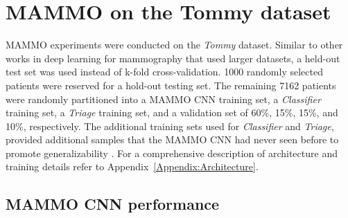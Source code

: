 \documentclass[journal]{IEEEtran}
\begin{document}
\section{MAMMO on the Tommy dataset}

MAMMO experiments were conducted on the \textit{Tommy} dataset. Similar to other works in deep learning for mammography that used larger datasets, a held-out test set was used instead of k-fold cross-validation.  1000 randomly selected patients were reserved for a hold-out testing set.  The remaining 7162 patients were randomly partitioned into a MAMMO CNN training set, a \textit{Classifier} training set, a \textit{Triage} training set, and a validation set of 60\%, 15\%, 15\%, and 10\%, respectively.  The additional training sets used for \textit{Classifier} and \textit{Triage}, provided additional samples that the MAMMO CNN had never seen before to promote generalizability \cite{cascade-ensemble, stacked-ensemble}.  For a comprehensive description of architecture and training details refer to Appendix~\ref{Appendix:Architecture}. 

\subsection{MAMMO CNN performance}
\end{document}
